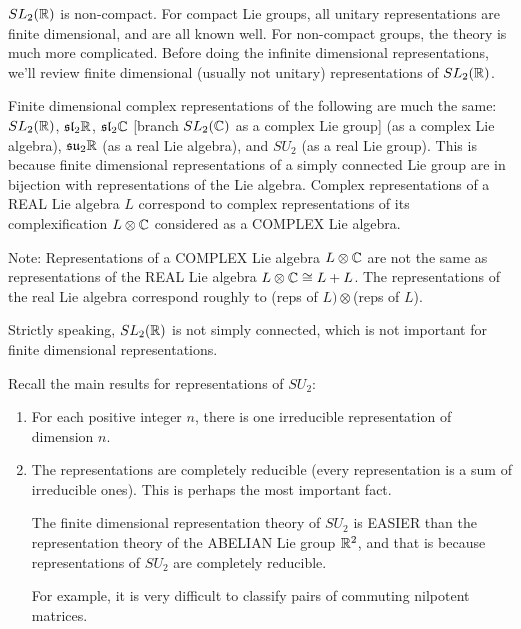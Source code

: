 \setcounter{lecture}{30}

 $SL_2(\mathbb{R})$ is non-compact. For compact Lie groups, all unitary representations are
 finite dimensional, and are all known well. For non-compact groups, the theory is
 much more complicated. Before doing the infinite dimensional representations, we'll
 review finite dimensional (usually not unitary) representations of $SL_2(\mathbb{R})$.

  Finite dimensional complex
 representations of the following are much the same: $SL_2(\mathbb{R})$, $\mathfrak{sl}_2\mathbb{R}$, $\mathfrak{sl}_2
 \mathbb{C}$ [branch $SL_2(\mathbb{C})$ as a complex Lie group] (as a complex Lie algebra),
 $\mathfrak{su}_2\mathbb{R}$ (as a real Lie algebra), and $SU_2$ (as a real Lie group). This
 is because finite dimensional representations of a simply connected Lie group are in
 bijection with representations of the Lie algebra. Complex representations of a REAL
 Lie algebra $L$ correspond to complex representations of its complexification
 $L\otimes \mathbb{C}$ considered as a COMPLEX Lie algebra.

 Note: Representations of a COMPLEX Lie algebra $L\otimes \mathbb{C}$ are not the same
 as representations of the REAL Lie algebra $L\otimes \mathbb{C}\cong L+ L$. The
 representations of the real Lie algebra correspond roughly to (reps of
 $L)\otimes$(reps of $L$).

 Strictly speaking, $SL_2(\mathbb{R})$ is not simply connected, which is not important for
 finite dimensional representations.

 Recall the main results for representations of $SU_2$:
 \begin{enumerate}
   \item For each positive integer $n$, there is one irreducible representation of
   dimension $n$.

   \item The representations are completely reducible (every representation is a sum
   of irreducible ones). This is perhaps the most important fact.

   The finite dimensional representation theory of $SU_2$ is EASIER than the
   representation theory of the ABELIAN Lie group $\mathbb{R}^2$, and that is because
   representations of $SU_2$ are completely reducible.

   For example, it is very difficult to classify pairs of commuting nilpotent
   matrices.
 \end{enumerate}


